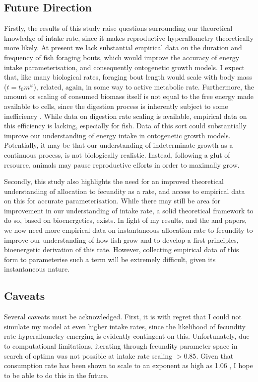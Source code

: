 \documentclass[a4paper]{article} %
\begin{document}
\subsection{Future Direction}
Firstly, the results of this study raise questions surrounding our theoretical knowledge of intake rate, since it makes reproductive hyperallometry theoretically more likely. At present we lack substantial empirical data on the duration and frequency of fish foraging bouts, which would improve the accuracy of energy intake parameterisation, and consequently ontogenetic growth models.  I expect that, like many biological rates, foraging bout length would scale with body mass ($t = t_{0}m^{\psi}$), related, again, in some way to active metabolic rate. Furthermore, the amount or scaling of consumed biomass itself is not equal to the free energy made available to cells, since the digestion process is inherently subject to some inefficiency \autocite{VanGemert2019}. While data on digestion rate scaling is available, empirical data on this efficiency is lacking, especially for fish. Data of this sort could substantially improve our understanding of energy intake in ontogenetic growth models. Potentially, it may be that our understanding of indeterminate growth as a continuous process, is not biologically realistic. Instead, following a glut of resource, animals may pause reproductive efforts in order to maximally grow.

Secondly, this study also highlights the need for an improved theoretical understanding of allocation to fecundity as a rate, and access to empirical data on this for accurate parameterisation. While there may still be area for improvement in our understanding of intake rate, a solid theoretical framework to do so, based on bioenergetics, exists. In light of my results, and the \textcite{Barneche2018-reproductive_output} and \textcite{Marshall2019b} papers, we now need more empirical data on instantaneous allocation rate to fecundity to improve our understanding of how fish grow and to develop a first-principles, bioenergetic derivation of this rate. However, collecting empirical data of this form to parameterise such a term will be extremely difficult, given its instantaneous nature.

\subsection{Caveats}
Several caveats must be acknowledged. First, it is with regret that I could not simulate my model at even higher intake rates, since the likelihood of fecundity rate hyperallometry emerging is evidently contingent on this. Unfortunately, due to computational limitations, iterating through fecundity parameter space in search of optima was not possible at intake rate scaling $> 0.85$. Given that consumption rate has been shown to scale to an exponent as high as 1.06 \autocite{Pawar2012}, I hope to be able to do this in the future.
\end{document}
